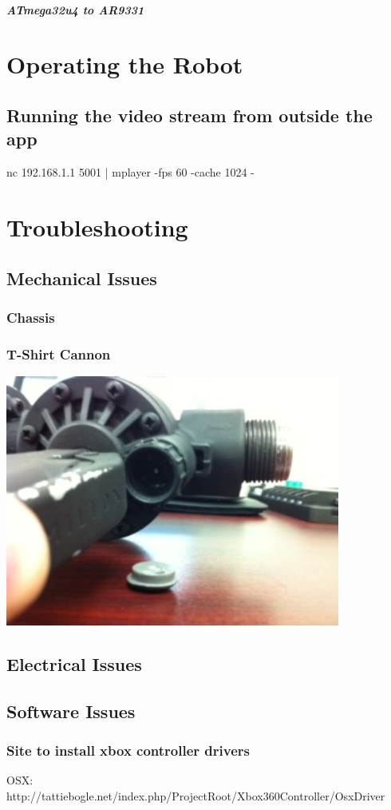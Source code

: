 \documentclass[letterpaper,12pt]{report}
\begin{document}
\paragraph{ATmega32u4 to AR9331}
\label{sec:mega_ath_msg}

\chapter{Operating the Robot}

\section{Running the video stream from outside the app}
nc 192.168.1.1 5001 | mplayer -fps 60 -cache 1024 -

\chapter{Troubleshooting}

\section{Mechanical Issues}
\subsection{Chassis}
\subsection{T-Shirt Cannon}

\begin{center}
    \includegraphics[width=11cm]{pics/cannon/broken_release_valve.jpg}
\end{center}

\section{Electrical Issues}

\section{Software Issues}
\subsection{Site to install xbox controller drivers}
OSX: http://tattiebogle.net/index.php/ProjectRoot/Xbox360Controller/OsxDriver
\end{document}
